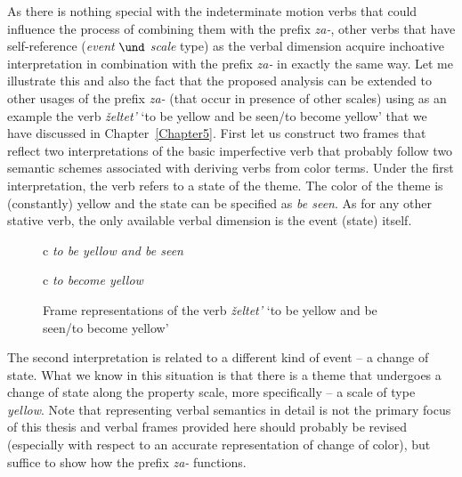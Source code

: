 As there is nothing special with the indeterminate motion verbs that could influence the process of combining them with the prefix \textit{za-}, other verbs that have self-reference (\textit{event} $\und$ \textit{scale} type) as the verbal dimension acquire inchoative interpretation in combination with the prefix \textit{za-} in exactly the same way. Let me illustrate this and also the fact that the proposed analysis can be extended to other usages of the prefix \textit{za-} (that occur in presence of other scales) using as an example the verb \textit{\v{z}eltet'} `to be yellow and be seen/to become yellow' that we have discussed in Chapter~\ref{Chapter5}. First let us construct two frames that reflect two interpretations of the basic imperfective verb that probably follow two semantic schemes associated with deriving verbs from color terms. Under the first interpretation, the verb refers to a state of the theme. The color of the theme is (constantly) yellow and the state can be specified as \textit{be seen}. As for any other stative verb, the only available verbal dimension is the event (state) itself. 
\begin{figure}
\begin{tabular}[t]{c}
\textit{to be yellow and be seen}\\
\end{tabular}
\hfill
\begin{tabular}[t]{c}
\textit{to become yellow}\\
\end{tabular}
\caption{Frame representations of the verb \textit{\v{z}eltet'} `to be yellow and be seen/to become yellow' \label{frame:zeltet}}
\end{figure}

The second interpretation is related to a different kind of event -- a change of state. What we know in this situation is that there is a theme that undergoes a change of state along the property scale, more specifically -- a scale of type \textit{yellow}. Note that representing verbal semantics in detail is not the primary focus of this thesis and verbal frames provided here should probably be revised (especially with respect to an accurate representation of change of color), but suffice to show how the prefix \textit{za-} functions.

